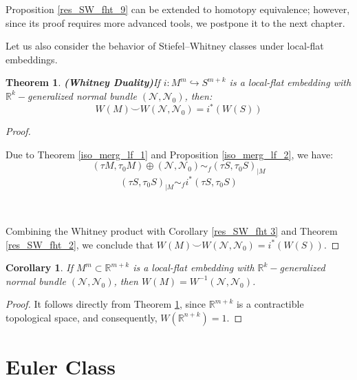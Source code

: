 \documentclass[12pt,oneside]{book}
\newtheorem{teo}    {Theorem}[chapter]
\newtheorem{cor}    {Corollary}[chapter]
\newcommand{\R}{\mathbb{R}}
\newcommand{\ccup}{\smile}
\begin{document}
    Proposition \ref{res_SW_fht_9} can be extended to homotopy equivalence; however, since its proof requires more advanced tools, we 
    postpone it to the next chapter.

    Let us also consider the behavior of Stiefel–Whitney classes under local-flat embeddings.

    \begin{teo}{\bf (Whitney Duality)}\label{res_SW_fht_10}
    	If $i:M^{m}\hookrightarrow S^{m+k}$ is a local-flat embedding with $\R^{k}-$generalized normal bundle 
        $(\mathcal{N},\mathcal{N}_{0})$, then:
    	$$ W(M)\ccup W(\mathcal{N},\mathcal{N}_{0})=i^{*}(W(S)) $$
    \end{teo}

    \begin{proof}

        \
    
    	Due to Theorem \ref{iso_merg_lf_1} and Proposition \ref{iso_merg_lf_2}, we have:
    	$$ (\tau M,\tau_{0}M)\oplus (\mathcal{N},\mathcal{N}_{0})\sim_{f} (\tau S,\tau_{0}S)_{|M} $$	
    	$$ (\tau S,\tau_{0}S)_{|M}\sim_{f} i^{*}(\tau S,\tau_{0}S) $$

        \
    
    	Combining the Whitney product with Corollary \ref{res_SW_fht 3} and Theorem \ref{res_SW_fht_2}, we conclude 
        that $W(M)\ccup W(\mathcal{N},\mathcal{N}_{0})=i^{*}(W(S))$.
    
    \end{proof}

    \begin{cor}\label{res_SW_fht_11}
    	If $M^{m}\subset \R^{m+k}$ is a local-flat embedding with $\R^{k}-$generalized normal bundle $(\mathcal{N},\mathcal{N}_{0})$, 
        then $W(M)=W^{-1}(\mathcal{N},\mathcal{N}_{0})$.
    \end{cor}

    \begin{proof}
    
    	It follows directly from Theorem \ref{res_SW_fht_10}, since $\R^{m+k}$ is a contractible topological space, and 
        consequently, $W(\R^{n+k})=1$.
    
    \end{proof}



    \section{Euler Class}\label{secao_euler}
\end{document}
